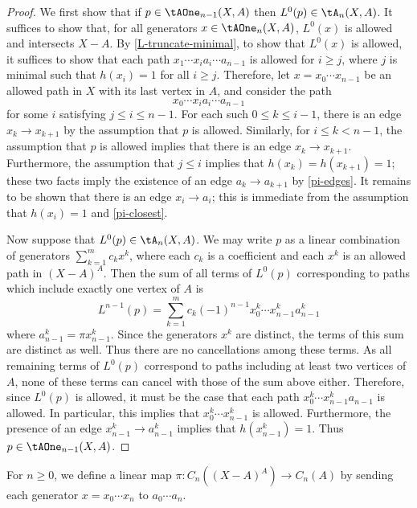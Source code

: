 \begin{proof}
We first show that if $p \in \tAOne_{n-1}(X,A)$ then $L^0(p) \in \tA_{n}(X,A)$.
It suffices to show that, for all generators $x \in \tAOne_{n}(X,A)$, $L^0(x)$ is allowed and intersects $X-A$. By \cref{L-truncate-minimal}, to show that $L^0(x)$ is allowed, it suffices to show that each path $x_1 \cdots x_i a_i \cdots a_{n-1}$ is allowed for $i \geq j$, where $j$ is minimal such that $h(x_i) = 1$ for all $i \geq j$. Therefore, let $x = x_0 \cdots x_{n-1}$ be an allowed path in $X$ with its last vertex in $A$, and consider the path
\[
x_0 \cdots x_i a_i \cdots a_{n-1}
\]
for some $i$ satisfying $j \leq i \leq n-1$. For each such $0 \leq k \leq i - 1$, there is an edge $x_k \to x_{k+1}$ by the assumption that $p$ is allowed. Similarly, for $i \leq k < n - 1$, the assumption that $p$ is allowed implies that there is an edge $x_k \to x_{k+1}$. Furthermore, the assumption that $j \leq i$ implies that $h(x_k) = h(x_{k+1}) = 1$; these two facts imply the existence of an edge $a_k \to a_{k+1}$ by \cref{pi-edges}. It remains to be shown that there is an edge $x_i \to a_i$; this is immediate from the assumption that $h(x_i) = 1$ and \cref{pi-closest}.

Now suppose that $L^0(p) \in \tA_{n}(X,A)$. We may write $p$ as a linear combination of generators $\sum_{k = 1}^m c_k x^k$, where each $c_k$ is a coefficient and each $x^k$ is an allowed path in $(X-A)^A$. Then the sum of all terms of $L^0(p)$ corresponding to paths which include exactly one vertex of $A$ is
\[
L^{n-1}(p) = \sum_{k=1}^{m} c_k (-1)^{n-1} x^k_0 \cdots x^k_{n-1} a^k_{n-1}
\]
where $a^k_{n-1} = \pi x^k_{n-1}$. Since the generators $x^k$ are distinct, the terms of this sum are distinct as well. Thus there are no cancellations among these terms. As all remaining terms of $L^0(p)$ correspond to paths including at least two vertices of $A$, none of these terms can cancel with those of the sum above either. Therefore, since  $L^0(p)$ is allowed, it must be the case that each path $x^k_0 \cdots x^k_{n-1} a_{n-1}$ is allowed. In particular, this implies that $x^k_0 \cdots x^k_{n-1}$ is allowed. Furthermore, the presence of an edge $x^k_{n-1} \to a^k_{n-1}$ implies that $h(x^k_{n-1}) = 1$. Thus $p \in \tAOne_{n-1}(X,A)$.
\end{proof}

\begin{defi}\label{pi-linear-def}
For $n \geq 0$, we define a linear map $\pi \colon C_{n}((X-A)^A) \to C_{n}(A)$ by sending each generator $x = x_0 \cdots x_n$ to $a_0 \cdots a_n$.
\end{defi}

